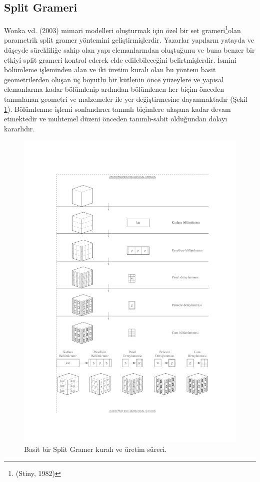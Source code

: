 \documentclass[12pt,turkish,a4paperpaper,]{report}
\begin{document}
\hypertarget{split-grameri}{%
\subsection{Split Grameri}\label{split-grameri}}

Wonka vd. (2003) mimari modelleri oluşturmak için özel bir set
grameri\footnote{(Stiny, 1982)}olan parametrik split gramer yöntemini
geliştirmişlerdir. Yazarlar yapıların yatayda ve düşeyde sürekliliğe
sahip olan yapı elemanlarından oluştuğunu ve buna benzer bir etkiyi
split grameri kontrol ederek elde edilebileceğini belirtmişlerdir.
İsmini bölümleme işleminden alan ve iki üretim kuralı olan bu yöntem
basit geometrilerden oluşan üç boyutlu bir kütlenin önce yüzeylere ve
yapısal elemanlarına kadar bölümlenip ardından bölümlenen her biçim
önceden tanımlanan geometri ve malzemeler ile yer değiştirmesine
dayanmaktadır (Şekil \ref{splitGrammar}). Bölümlenme işlemi sonlandırıcı
tanımlı biçimlere ulaşana kadar devam etmektedir ve muhtemel düzeni
önceden tanımlı-sabit olduğundan dolayı kararlıdır.

\begin{figure}
\centering
\includegraphics[width=1\textwidth,height=\textheight]{source/figures/splitGrammar.pdf}
\caption{Basit bir Split Gramer kuralı ve üretim süreci.
\label{splitGrammar}}
\end{figure}
\end{document}
